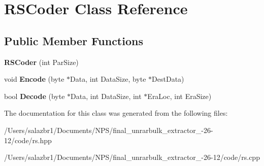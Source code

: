 \hypertarget{class_r_s_coder}{\section{R\-S\-Coder Class Reference}
\label{class_r_s_coder}
}
\subsection*{Public Member Functions}
\begin{DoxyCompactItemize}
\item 
\hypertarget{class_r_s_coder_ad444b638e629a4d93401e97a1ad17413}{{\bfseries R\-S\-Coder} (int Par\-Size)}\label{class_r_s_coder_ad444b638e629a4d93401e97a1ad17413}

\item 
\hypertarget{class_r_s_coder_a565e21b1562338ad0add7e64eed8664f}{void {\bfseries Encode} (byte $\ast$Data, int Data\-Size, byte $\ast$Dest\-Data)}\label{class_r_s_coder_a565e21b1562338ad0add7e64eed8664f}

\item 
\hypertarget{class_r_s_coder_a59e6b0965a939e758ade840967773c37}{bool {\bfseries Decode} (byte $\ast$Data, int Data\-Size, int $\ast$Era\-Loc, int Era\-Size)}\label{class_r_s_coder_a59e6b0965a939e758ade840967773c37}

\end{DoxyCompactItemize}


The documentation for this class was generated from the following files\-:\begin{DoxyCompactItemize}
\item 
/\-Users/salazbr1/\-Documents/\-N\-P\-S/final\-\_\-unrarbulk\-\_\-extractor\-\_-\/26-\/12/code/rs.\-hpp\item 
/\-Users/salazbr1/\-Documents/\-N\-P\-S/final\-\_\-unrarbulk\-\_\-extractor\-\_-\/26-\/12/code/rs.\-cpp\end{DoxyCompactItemize}
